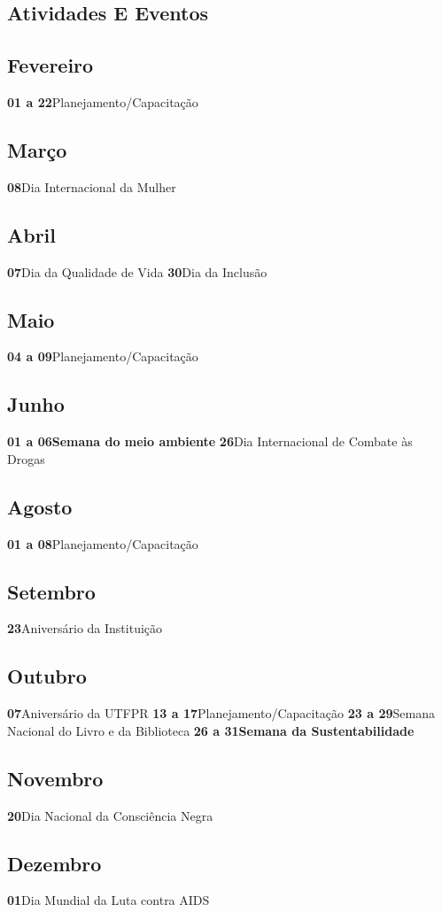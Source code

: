 \documentclass[thesis]{hmcposter}
\begin{document}
\begin{poster}
\section{\color{hmcorange}Atividades E Eventos}\subsection{Fevereiro}\textbf{01 a 22}\quad \quad Planejamento/Capacitação \subsection{Março}\textbf{08}\quad \quad \quad \quad Dia Internacional da Mulher \subsection{Abril}\textbf{07}\quad \quad \quad \quad Dia da Qualidade de Vida
 \newline\textbf{30}\quad \quad \quad \quad Dia da Inclusão \subsection{Maio}\textbf{04 a 09}\quad \quad Planejamento/Capacitação \subsection{Junho}\textbf{01 a 06}\quad \quad \textbf{Semana do meio ambiente} \newline\textbf{26}\quad \quad \quad \quad Dia Internacional de Combate às Drogas \subsection{Agosto}\textbf{01 a 08}\quad \quad Planejamento/Capacitação \subsection{Setembro}\textbf{23}\quad \quad \quad \quad Aniversário da Instituição \subsection{Outubro}\textbf{07}\quad \quad \quad \quad Aniversário da UTFPR \newline\textbf{13 a 17}\quad \quad Planejamento/Capacitação \newline\textbf{23 a 29}\quad \quad Semana Nacional do Livro e da Biblioteca  \newline\textbf{26 a 31}\quad \quad \textbf{Semana da Sustentabilidade} \subsection{Novembro}\textbf{20}\quad \quad \quad \quad Dia Nacional da Consciência Negra \subsection{Dezembro}\textbf{01}\quad \quad \quad \quad Dia Mundial da Luta contra AIDS
 \newline\end{poster}
\end{document}

